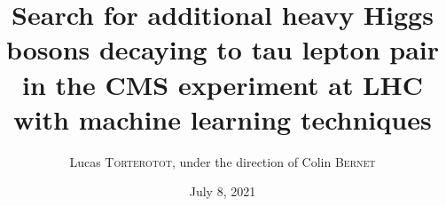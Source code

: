 \documentclass[10pt,aspectratio=169]{beamer}
\institute[IP2I]{Institut de Physique des deux Infinis -- Lyon} %
\title[Search for additional heavy Higgs bosons decaying to tau lepton pair in the CMS experiment...]{Search for additional heavy Higgs bosons decaying to tau lepton pair in the CMS experiment at LHC with machine learning techniques}
\author[Lucas \textsc{Torterotot} -- \mailto{lucas.torterotot@ipnl.in2p3.fr}]{Lucas \textsc{Torterotot}, under the direction of Colin \textsc{Bernet}}
\date{July 8, 2021}
\begin{document}
\def\mythousandsep{\,}

%
%
%
%
%
%
%
%
%
%
%
%
%
\end{document}
